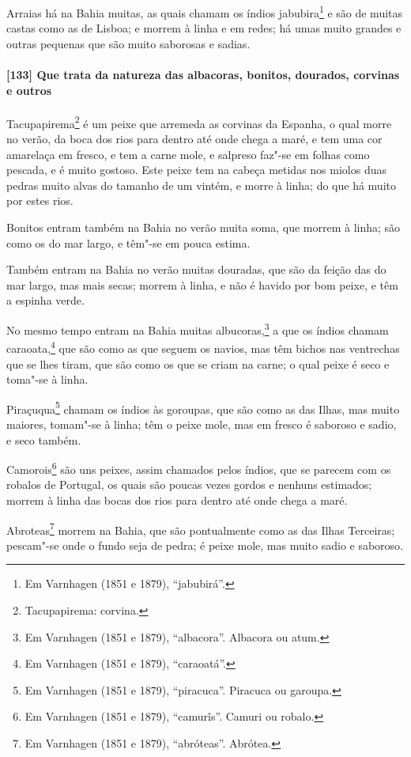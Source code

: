 \begin{linenumbers}
Arraias há na Bahia muitas, as quais chamam os índios jabubira\footnote{ Em Varnhagen
(1851 e 1879), ``jabubirá''.} e são de muitas castas como as de Lisboa; e morrem à linha e
em redes; há umas muito grandes e outras pequenas que são muito saborosas e sadias.

\paragraph{[133] Que trata da natureza das albacoras, bonitos, dourados, corvinas e outros}\quad
Tacupapirema\footnote{ Tacupapirema: corvina.} é um peixe que arremeda as corvinas da
Espanha, o qual morre no verão, da boca dos rios para dentro até onde chega a maré, e tem
uma cor amarelaça em fresco, e tem a carne mole, e salpreso faz"-se em folhas como pescada,
e é muito gostoso. Este peixe tem na cabeça metidas nos miolos duas pedras muito alvas do
tamanho de um vintém, e morre à linha; do que há muito por estes rios.

Bonitos entram também na Bahia no verão muita soma, que morrem à linha; são como os do mar
largo, e têm"-se em pouca estima.

Também entram na Bahia no verão muitas douradas, que são da feição das do mar largo, mas
mais secas; morrem à linha, e não é havido por bom peixe, e têm a espinha verde.

No mesmo tempo entram na Bahia muitas albucoras,\footnote{ Em Varnhagen (1851 e 1879),
``albacora''. Albacora ou atum.} a que os índios chamam caraoata,\footnote{ Em Varnhagen
(1851 e 1879), ``caraoatá''.} que são como as que seguem os navios, mas têm bichos nas
ventrechas que se lhes tiram, que são como os que se criam na carne; o qual peixe é seco e
toma"-se à linha.

Piraçuqua\footnote{ Em Varnhagen (1851 e 1879), ``piracuca''. Piracuca ou garoupa.} chamam
os índios às goroupas, que são como as das Ilhas, mas muito maiores, tomam"-se à linha; têm
o peixe mole, mas em fresco é saboroso e sadio, e seco também.

Camorois\footnote{ Em Varnhagen (1851 e 1879), ``camurîs''. Camuri ou robalo.} são uns
peixes, assim chamados pelos índios, que se parecem com os robalos de Portugal, os quais
são poucas vezes gordos e nenhuns estimados; morrem à linha das bocas dos rios para dentro
até onde chega a maré.

Abroteas\footnote{ Em Varnhagen (1851 e 1879), ``abróteas''. Abrótea.} morrem na Bahia,
que são pontualmente como as das Ilhas Terceiras; pescam"-se onde o fundo seja de pedra; é
peixe mole, mas muito sadio e saboroso.


\end{linenumbers}
